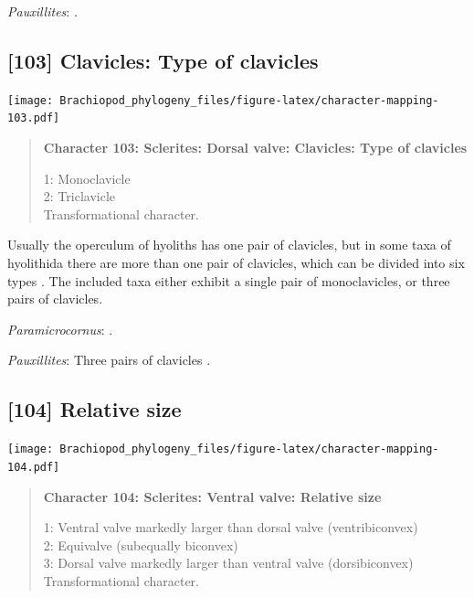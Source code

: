 \documentclass[openany]{book}
\begin{document}
\hypertarget{Pauxillites-coding-102}{}
\emph{Pauxillites}: \citet{Marek1966}.

\subsection*{{[}103{]} Clavicles: Type of
clavicles}\label{clavicles-type-of-clavicles}

\texttt{[image: Brachiopod\_phylogeny\_files/figure-latex/character-mapping-103.pdf]}

\begin{quote}
\textbf{Character 103: Sclerites: Dorsal valve: Clavicles: Type of
clavicles}

1: Monoclavicle\\
2: Triclavicle\\
Transformational character.
\end{quote}

Usually the operculum of hyoliths has one pair of clavicles, but in some
taxa of hyolithida there are more than one pair of clavicles, which can
be divided into six types \citep{Marek1967}. The included taxa either
exhibit a single pair of monoclavicles, or three pairs of clavicles.

\hypertarget{Paramicrocornus-coding-103}{}
\emph{Paramicrocornus}: \citet{Zhang2018Ahyolithid}.

\hypertarget{Pauxillites-coding-103}{}
\emph{Pauxillites}: Three pairs of clavicles \citep{Marek1966}.

\subsection*{{[}104{]} Relative size}\label{relative-size}

\texttt{[image: Brachiopod\_phylogeny\_files/figure-latex/character-mapping-104.pdf]}

\begin{quote}
\textbf{Character 104: Sclerites: Ventral valve: Relative size}

1: Ventral valve markedly larger than dorsal valve (ventribiconvex)\\
2: Equivalve (subequally biconvex)\\
3: Dorsal valve markedly larger than ventral valve (dorsibiconvex)\\
Transformational character.
\end{quote}
\end{document}
